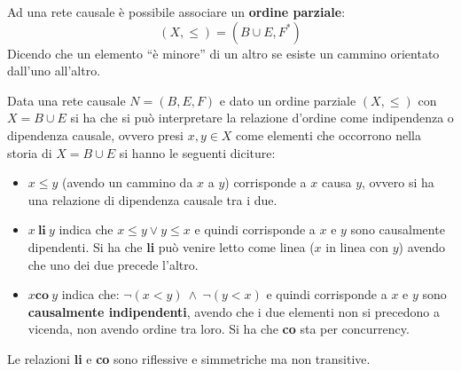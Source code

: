 Ad una rete causale è possibile associare un \textbf{ordine parziale}:
\begin{equation}
    (X, \leq) = (B \cup E, F^{\ast})
\end{equation}
Dicendo che un elemento “è minore” di un altro se esiste un cammino orientato
dall'uno all'altro.
\begin{definizione}
    Data una rete causale $N = (B,E, F)$ e dato un ordine parziale $(X, \leq)$
    con $X = B \cup E$ si ha che si può interpretare la relazione d'ordine come
    indipendenza o dipendenza causale, ovvero presi $x, y \in X$ come elementi
    che occorrono nella storia di $X = B \cup E$ si hanno le seguenti diciture:
    \begin{itemize}
        \item $x \leq y$ (avendo un cammino da $x$ a $y$) corrisponde a $x$ causa
              $y$, ovvero si ha una relazione di dipendenza causale tra i due.
        \item $x \ \textbf{li} \ y$ indica che $x \leq y \lor y \leq x$ e quindi
              corrisponde a $x$ e $y$ sono causalmente dipendenti. Si ha che \textbf{li}
              può venire letto come linea ($x$ in linea con $y$) avendo che uno dei
              due precede l'altro.
        \item $x \textbf{co} \ y$ indica che: $\lnot(x < y)\  \land  \ \lnot (y < x)$
              e quindi corrisponde a $x$ e $y$ sono \textbf{causalmente indipendenti},
              avendo che i due elementi non si precedono a vicenda, non avendo ordine
              tra loro. Si ha che \textbf{co} sta per concurrency.
    \end{itemize}
    Le relazioni \textbf{li} e \textbf{co} sono riflessive e simmetriche ma non transitive.
\end{definizione}
